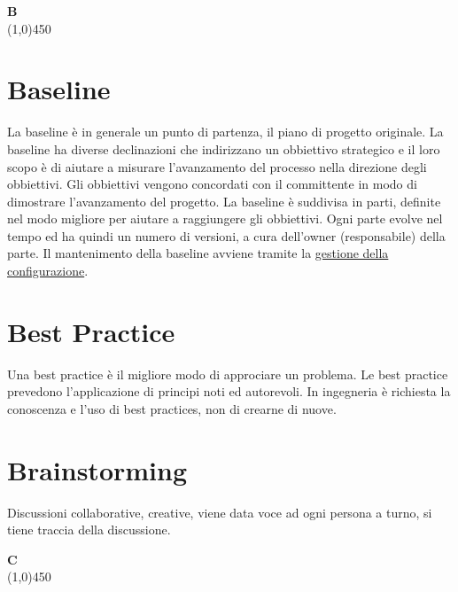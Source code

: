\documentclass[11pt]{article}
\begin{document}
	{\Huge{\textbf{B}}} \\
	\line(1,0){450}
	
	\section{\LARGE Baseline}
	\label{sec:baseline}
	La baseline è in generale un punto di partenza, il piano di progetto originale. La baseline ha diverse declinazioni che indirizzano un obbiettivo strategico e il loro scopo è di aiutare a misurare l'avanzamento del processo nella direzione degli obbiettivi. Gli obbiettivi vengono concordati con il committente in modo di dimostrare l'avanzamento del progetto. La baseline è suddivisa in parti, definite nel modo migliore per aiutare a raggiungere gli obbiettivi. Ogni parte evolve nel tempo ed ha quindi un numero di versioni, a cura dell'owner (responsabile) della parte. Il mantenimento della baseline avviene tramite la \hyperref[sec:controlloconfigurazione]{gestione della configurazione}. 
	
	\section{\LARGE Best Practice}
	\label{sec:bestpractice}
	Una best practice è il migliore modo di approciare un problema. Le best practice prevedono l'applicazione di principi noti ed autorevoli. In ingegneria è richiesta la conoscenza e l'uso di best practices, non di crearne di nuove.

	\section{\LARGE Brainstorming}
	\label{sec:brainstorming}
	Discussioni collaborative, creative, viene data voce ad ogni persona a turno, si tiene traccia della discussione. \newpage


	{\Huge{\textbf{C}}} \\
	\line(1,0){450}

\end{document}
